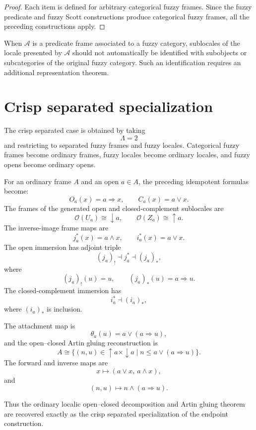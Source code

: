 \begin{proof}
Each item is defined for arbitrary categorical fuzzy frames.  Since the fuzzy
predicate and fuzzy Scott constructions produce categorical fuzzy frames, all
the preceding constructions apply.
\end{proof}

\begin{remark}
\label{rem:sublocales-localic-not-spatial}
When \(\mathcal A\) is a predicate frame associated to a fuzzy category,
sublocales of the locale presented by \(\mathcal A\) should not automatically be
identified with subobjects or subcategories of the original fuzzy category.
Such an identification requires an additional representation theorem.
\end{remark}

\section{Crisp separated specialization}
\label{sec:crisp-separated-open-closed-gluing}

The crisp separated case is obtained by taking
\[
    \Lambda=2
\]
and restricting to separated fuzzy frames and fuzzy locales.  Categorical fuzzy
frames become ordinary frames, fuzzy locales become ordinary locales, and fuzzy
opens become ordinary opens.

For an ordinary frame \(A\) and an open \(a\in A\), the preceding idempotent
formulas become:
\[
    O_a(x)=a\Rightarrow x,
    \qquad
    C_a(x)=a\vee x.
\]
The frames of the generated open and closed-complement sublocales are
\[
    \mathcal O(U_a)\cong\downarrow a,
    \qquad
    \mathcal O(Z_a)\cong\uparrow a.
\]
The inverse-image frame maps are
\[
    j_a^\ast(x)=a\wedge x,
    \qquad
    i_a^\ast(x)=a\vee x.
\]
The open immersion has adjoint triple
\[
    (j_a)_!\dashv j_a^\ast\dashv(j_a)_\ast,
\]
where
\[
    (j_a)_!(u)=u,
    \qquad
    (j_a)_\ast(u)=a\Rightarrow u.
\]
The closed-complement immersion has
\[
    i_a^\ast\dashv(i_a)_\ast,
\]
where \((i_a)_\ast\) is inclusion.

The attachment map is
\[
    \theta_a(u)=a\vee(a\Rightarrow u),
\]
and the open--closed Artin gluing reconstruction is
\[
    A\cong
    \{(n,u)\in\uparrow a\times\downarrow a
      \mid
      n\leq a\vee(a\Rightarrow u)\}.
\]
The forward and inverse maps are
\[
    x\longmapsto(a\vee x,\ a\wedge x),
\]
and
\[
    (n,u)\longmapsto n\wedge(a\Rightarrow u).
\]

Thus the ordinary localic open--closed decomposition and Artin gluing theorem
are recovered exactly as the crisp separated specialization of the endpoint
construction.

